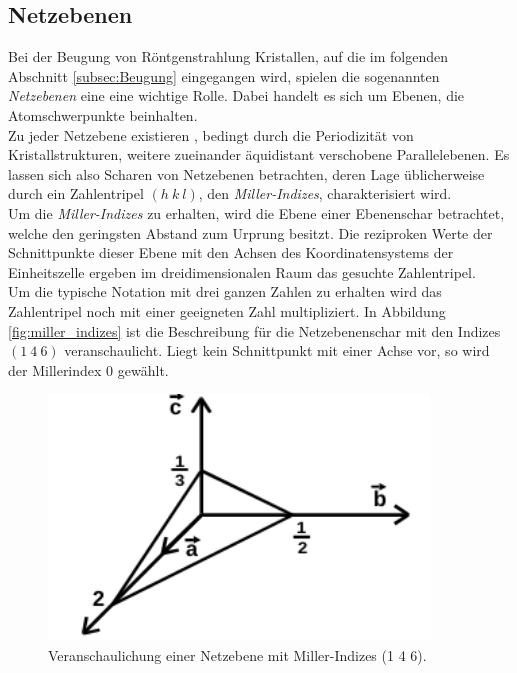 \subsection{Netzebenen}
\label{subsec:netzebenen}
Bei der Beugung von Röntgenstrahlung Kristallen,
auf die im folgenden Abschnitt \ref{subsec:Beugung}
eingegangen wird, spielen die sogenannten \textit{Netzebenen}
eine eine wichtige Rolle. Dabei handelt es sich
um Ebenen, die Atomschwerpunkte beinhalten.\\
Zu jeder Netzebene existieren , bedingt durch die
Periodizität von Kristallstrukturen, weitere zueinander
äquidistant verschobene Parallelebenen.
Es lassen sich also Scharen von Netzebenen betrachten,
deren Lage üblicherweise durch ein Zahlentripel $(h \ k \ l)$,
den \textit{Miller-Indizes}, charakterisiert wird.\\
Um die \textit{Miller-Indizes} zu erhalten, wird die
Ebene einer Ebenenschar betrachtet, welche den geringsten
Abstand zum Urprung besitzt. Die reziproken Werte
der Schnittpunkte dieser Ebene mit den Achsen des
Koordinatensystems der Einheitszelle ergeben im
dreidimensionalen Raum das gesuchte Zahlentripel.\\
Um die typische Notation mit drei ganzen Zahlen zu erhalten
wird das Zahlentripel noch mit einer geeigneten Zahl
multipliziert. In Abbildung \ref{fig:miller_indizes}
ist die Beschreibung für die Netzebenenschar mit den
Indizes $(1 \ 4 \ 6)$ veranschaulicht.
Liegt kein Schnittpunkt mit einer
Achse vor, so wird der Millerindex $0$ gewählt.

\begin{figure}[hhh]
  \centering
  \includegraphics[width=0.9\textwidth]{abbildungen/miller_ind.png}
  \caption{Veranschaulichung einer Netzebene mit Miller-Indizes (1 4 6).\cite{sample}}
\end{figure}

